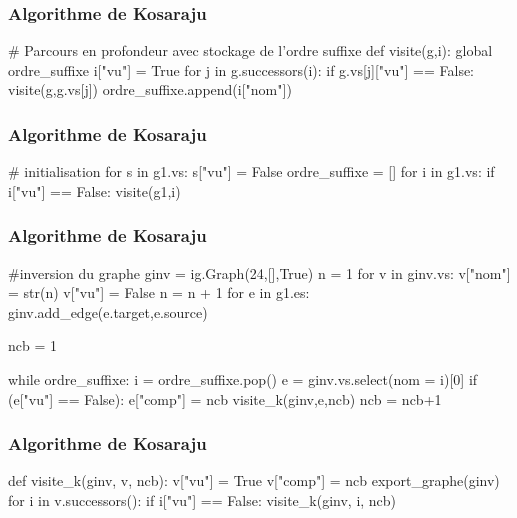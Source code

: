 
\begin{frame}[fragile]
\frametitle{Algorithme de Kosaraju}
\begin{pythoncode}
# Parcours en profondeur avec stockage de l'ordre suffixe 
def visite(g,i):
    global ordre_suffixe
    i["vu"] = True
    for j in g.successors(i):
        if g.vs[j]["vu"] == False:
            visite(g,g.vs[j])
    ordre_suffixe.append(i["nom"])


\end{pythoncode}
\end{frame}


\begin{frame}[fragile]
\frametitle{Algorithme de Kosaraju}
\begin{pythoncode}    
# initialisation
for s in g1.vs:
    s["vu"] = False
ordre_suffixe = []
for i in g1.vs:
    if i["vu"] == False:
        visite(g1,i)

\end{pythoncode}
\end{frame}

\begin{frame}[fragile]
\frametitle{Algorithme de Kosaraju}
\begin{pythoncode}    

#inversion du graphe 
ginv = ig.Graph(24,[],True)
n = 1
for v in ginv.vs:
    v["nom"] = str(n) 
    v["vu"] = False 
    n = n + 1
for e in g1.es: 
    ginv.add_edge(e.target,e.source)

ncb = 1

while ordre_suffixe:
    i = ordre_suffixe.pop()
    e = ginv.vs.select(nom = i)[0]
    if (e["vu"] == False):
        e["comp"] = ncb
        visite_k(ginv,e,ncb)
        ncb = ncb+1
\end{pythoncode}
\end{frame}

\begin{frame}[fragile]
    \frametitle{Algorithme de Kosaraju}
    \begin{pythoncode}   
    
    def visite_k(ginv, v, ncb):
        v["vu"] = True
        v["comp"] = ncb
        export_graphe(ginv)
        for i in v.successors():
            if i["vu"] == False:
                visite_k(ginv, i, ncb)
    \end{pythoncode}
    \end{frame}
    